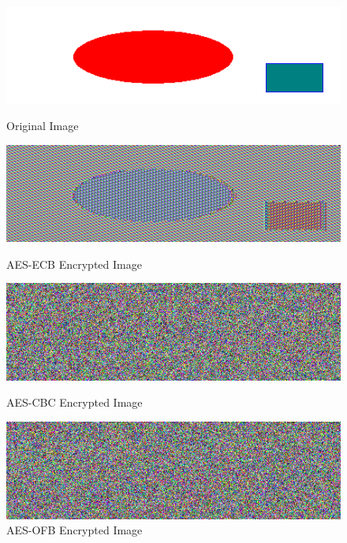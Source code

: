 	\pagebreak
			
	\begin{figure}  
	\centering
	\includegraphics{pic_original}
	\caption{Original Image}
	
	\includegraphics{pic-aes-128-ecb}
	\caption{AES-ECB Encrypted Image}
	
	\includegraphics{pic-aes-128-cbc}
	\caption{AES-CBC Encrypted Image}
	
	\includegraphics{pic-aes-128-ofb}
	\caption{AES-OFB Encrypted Image}
	\end{figure}
			
			
